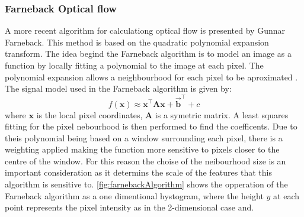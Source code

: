 \documentclass{UoNMCHA}
\numberwithin{equation}{section}
\begin{document}
\subsubsection{Farneback Optical flow}
A more recent algorithm for calculationg optical flow is presented by Gunnar Farneback. This method is based on the quadratic polynomial expansion transform. The idea begind the Farneback algorithm is to model an image as a function by locally fitting a polynomial to the image at each pixel. The polynomial expansion allows a neighbourhood for each pixel to be aproximated \cite{farneback2003two}. The signal model used in the Farneback algorithm is given by:
\begin{equation}
	f(\mathbf{x}) \approx \mathbf{x}^{\top}\mathbf{A}\mathbf{x} + \mathbf{\vec{b}}^{\top} + c
\end{equation}
where $\mathbf{x}$ is the local pixel coordinates, $\mathbf{A}$ is a symetric matrix. A least squares fitting for the pixel nebourhood is then performed to find the coefficents. Due to theis polynomial being based on a window surrounding each pixel, there is a weighting applied making the function more sensitive to pixels closer to the centre of the window. For this reason the choise of the neibourhood size is an important consideration as it determins the scale of the features that this algorithm is sensitive to. \cref{fig:farnebackAlgorithm} shows the opperation of the Farneback algorithm as a one dimentional hystogram, where the height $y$ at each point represents the pixel intensity as in the 2-dimensional case and.
\end{document}
